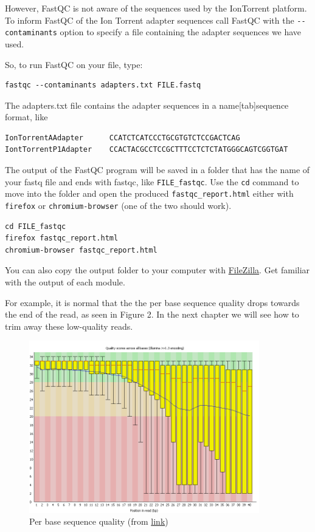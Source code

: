 \documentclass[11pt]{article}
\begin{document}
However, FastQC is not aware of the sequences used by the IonTorrent
platform. To inform FastQC of the Ion Torrent adapter sequences
call FastQC with the \texttt{-{}-contaminants} option to specify a file
containing the adapter sequences we have used.

So, to run FastQC on your file, type:

\begin{verbatim}
fastqc --contaminants adapters.txt FILE.fastq
\end{verbatim}

The adapters.txt file contains the adapter sequences in a
name[tab]sequence format, like

\begin{verbatim}
IonTorrentAAdapter      CCATCTCATCCCTGCGTGTCTCCGACTCAG
IontTorrentP1Adapter    CCACTACGCCTCCGCTTTCCTCTCTATGGGCAGTCGGTGAT
\end{verbatim}

The output of the FastQC program will be saved in a folder that has
the name of your fastq file and ends with fastqc, like
\texttt{FILE\_fastqc}. Use the \texttt{cd} command to move into the folder and open
the produced \texttt{fastqc\_report.html} either with \texttt{firefox} or
\texttt{chromium-browser} (one of the two should work).

\begin{verbatim}
cd FILE_fastqc
firefox fastqc_report.html
chromium-browser fastqc_report.html
\end{verbatim}

You can also copy the output folder to your computer with \href{https://filezilla-project.org/}{FileZilla}.
Get familiar with the output of each module.


For example, it is normal that the the per base sequence quality drops
towards the end of the read, as seen in Figure 2. In the next chapter
we will see how to trim away these low-quality reads.

\begin{figure}[htb]
\centering
\includegraphics[width=10cm]{per_base_quality.png}
\caption{Per base sequence quality (from \href{http://www.bioinformatics.babraham.ac.uk/projects/fastqc/Help/3\%20Analysis\%20Modules/2\%20Per\%20Base\%20Sequence\%20Quality.html}{link})}
\end{figure}
\end{document}
